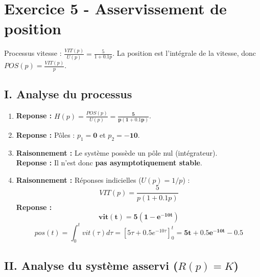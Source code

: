 \documentclass[11pt,a4paper]{article}
\begin{document}
\section*{Exercice 5 - Asservissement de position}

Processus vitesse : $\frac{VIT(p)}{U(p)} = \frac{5}{1+0.1p}$.
La position est l'intégrale de la vitesse, donc $POS(p) = \frac{VIT(p)}{p}$.

\subsection*{I. Analyse du processus}

\begin{enumerate}
    \item \textbf{Reponse :} $H(p) = \frac{POS(p)}{U(p)} = \mathbf{\frac{5}{p(1+0.1p)}}$.
    \item \textbf{Reponse :} Pôles : $p_1 = \mathbf{0}$ et $p_2 = \mathbf{-10}$.
    \item \textbf{Raisonnement :} Le système possède un pôle nul (intégrateur). \\
    \textbf{Reponse :} Il n'est donc \textbf{pas asymptotiquement stable}.
    \item \textbf{Raisonnement :} Réponses indicielles ($U(p) = 1/p$) :
    $$ VIT(p) = \frac{5}{p(1+0.1p)} $$
    \textbf{Reponse :} 
    $$ \mathbf{vit(t) = 5(1-e^{-10t})} $$
    $$ pos(t) = \int_0^t vit(\tau)d\tau = \left[ 5\tau + 0.5e^{-10\tau} \right]_0^t = \mathbf{5t + 0.5e^{-10t} - 0.5} $$
\end{enumerate}

\subsection*{II. Analyse du système asservi ($R(p)=K$)}
\end{document}

